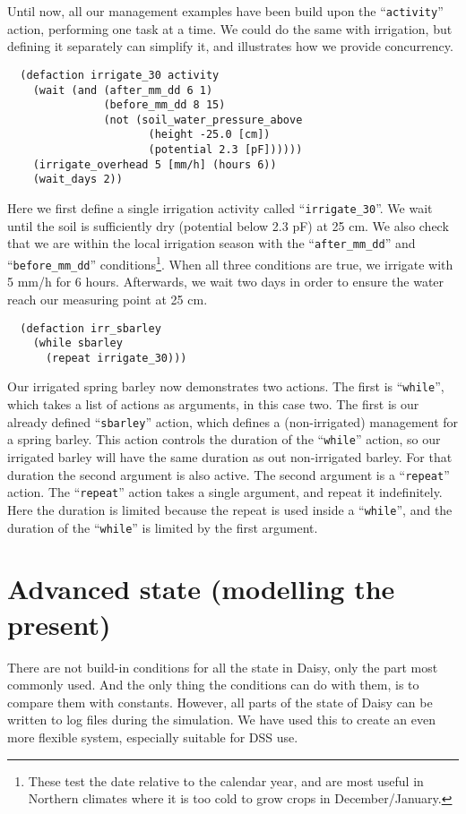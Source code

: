 \documentclass[a4paper]{article}
\newcommand{\dname}[1]{``\texttt{#1}''}
\begin{document}
Until now, all our management examples have been build upon the
\dname{activity} action, performing one task at a time.  We could
do the same with irrigation, but defining it separately can simplify
it, and illustrates how we provide concurrency.
\begin{verbatim}
  (defaction irrigate_30 activity 
    (wait (and (after_mm_dd 6 1)
               (before_mm_dd 8 15)
               (not (soil_water_pressure_above 
                      (height -25.0 [cm])
                      (potential 2.3 [pF])))))
    (irrigate_overhead 5 [mm/h] (hours 6))
    (wait_days 2))
\end{verbatim}
Here we first define a single irrigation activity called
\dname{irrigate\_30}.  We wait until the soil is sufficiently dry
(potential below 2.3 pF) at 25 cm.  We also check that we are within
the local irrigation season with the \dname{after\_mm\_dd} and
\dname{before\_mm\_dd} conditions\footnote{These test the date
relative to the calendar year, and are most useful in Northern
climates where it is too cold to grow crops in December/January.}.
When all three conditions are true, we irrigate with 5 mm/h for 6
hours.  Afterwards, we wait two days in order to ensure the water
reach our measuring point at 25 cm.
\begin{verbatim}
  (defaction irr_sbarley
    (while sbarley
      (repeat irrigate_30)))
\end{verbatim}
Our irrigated spring barley now demonstrates two actions.  The first
is \dname{while}, which takes a list of actions as arguments, in this
case two.  The first is our already defined \dname{sbarley} action,
which defines a (non-irrigated) management for a spring barley.  This
action controls the duration of the \dname{while} action, so our
irrigated barley will have the same duration as out non-irrigated
barley.  For that duration the second argument is also active.  The
second argument is a \dname{repeat} action.  The \dname{repeat} action
takes a single argument, and repeat it indefinitely.  Here the
duration is limited because the repeat is used inside a \dname{while}, and
the duration of the \dname{while} is limited by the first
argument.

\section{Advanced state (modelling the present)} 

There are not build-in conditions for all the state in Daisy, only the
part most commonly used.  And the only thing the conditions can do
with them, is to compare them with constants.  However, all parts of
the state of Daisy can be written to log files during the simulation.
We have used this to create an even more flexible system, especially
suitable for DSS use.
\end{document}
